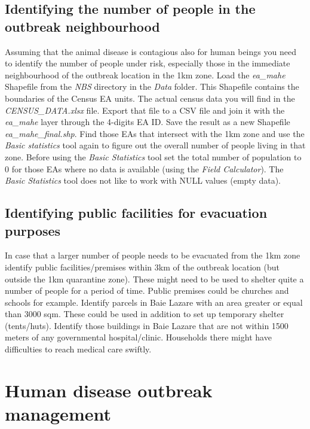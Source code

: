 \documentclass[a4paper,12pt,titlepage]{article}
\begin{document}
\subsection{Identifying the number of people in the outbreak neighbourhood}
Assuming that the animal disease is contagious also for human beings you need to identify the number of people under risk, especially those in the immediate neighbourhood of the outbreak location in the 1km zone. Load the \textit{ea\_mahe} Shapefile from the \textit{NBS} directory in the \textit{Data} folder. This Shapefile contains the boundaries of the Census EA units. The actual census data you will find in the \textit{CENSUS\_DATA.xlsx} file. Export that file to a CSV file and join it with the \textit{ea\_mahe} layer through the 4-digits EA ID. Save the result as a new Shapefile \textit{ea\_mahe\_final.shp}. Find those EAs that intersect with the 1km zone and use the \textit{Basic statistics} tool again to figure out the overall number of people living in that zone. Before using the \textit{Basic Statistics} tool set the total number of population to 0 for those EAs where no data is available (using the \textit{Field Calculator}). The \textit{Basic Statistics} tool does not like to work with NULL values (empty data).

\subsection{Identifying public facilities for evacuation purposes}
In case that a larger number of people needs to be evacuated from the 1km zone identify public facilities/premises within 3km of the outbreak location (but outside the 1km quarantine zone). These might need to be used to shelter quite a number of people for a period of time. Public premises could be churches and schools for example. Identify parcels in Baie Lazare with an area greater or equal than 3000 sqm. These could be used in addition to set up temporary shelter (tents/huts). Identify those buildings in Baie Lazare that are not within 1500 meters of any governmental hospital/clinic. Households there might have difficulties to reach medical care swiftly.

\section{Human disease outbreak management}
\end{document}
